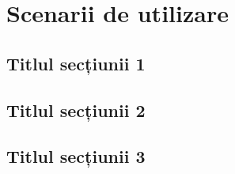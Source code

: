 \chapter{Scenarii de utilizare }


\section{Titlul secțiunii 1}


\section{Titlul secțiunii 2}


\section{Titlul secțiunii 3}

